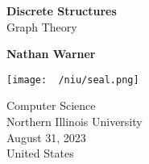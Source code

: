 \documentclass{report}
\title{\Huge{}}
\author{\huge{Nathan Warner}}
\date{\huge{}}
\begin{document}
        \begin{titlepage}
       \begin{center}
           \vspace*{1cm}
    
           \textbf{Discrete Structures} \\ 
           Graph Theory
    
           \vspace{0.5cm}
            
                
           \vspace{1.5cm}
    
           \textbf{Nathan Warner}
    
           \vfill
                
                
           \vspace{0.8cm}
         
           \texttt{[image: ~/niu/seal.png]}
                
           Computer Science \\
           Northern Illinois University\\
           August 31, 2023 \\
           United States\\
           
                
       \end{center}
    \end{titlepage}
    \tableofcontents
    \pagebreak \bigbreak \noindent
\end{document}
